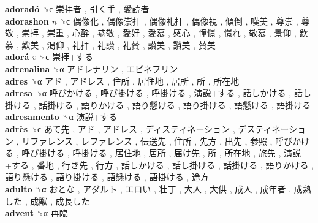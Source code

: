 \textbf{adoradó} ␝ϲ   崇拝者 ,  引く手 ,  愛読者   \\
\textbf{adorashon} \emph{n}  ␝ϲ   偶像化 ,  偶像崇拝 ,  偶像礼拝 ,  偶像視 ,  傾倒 ,  嘆美 ,  尊崇 ,  尊敬 ,  崇拝 ,  崇重 ,  心酔 ,  恭敬 ,  愛好 ,  愛慕 ,  感心 ,  憧憬 ,  憬れ ,  敬慕 ,  景仰 ,  欽慕 ,  歎美 ,  渇仰 ,  礼拝 ,  礼讃 ,  礼賛 ,  讃美 ,  讚美 ,  賛美   \\
\textbf{adorá} \emph{v}  ␝ϲ   崇拝+する   \\
\textbf{adrenalina} ␝α   アドレナリン ,  エピネフリン   \\
\textbf{adres} ␝α   アド ,  アドレス ,  住所 ,  居住地 ,  居所 ,  所 ,  所在地   \\
\textbf{adresa} ␝α   呼びかける ,  呼び掛ける ,  呼掛ける ,  演説+する ,  話しかける ,  話し掛ける ,  話掛ける ,  語りかける ,  語り懸ける ,  語り掛ける ,  語懸ける ,  語掛ける   \\
\textbf{adresamento} ␝α   演説+する   \\
\textbf{adrès} ␝ϲ   あて先 ,  アド ,  アドレス ,  ディスティネーション ,  デスティネーション ,  リファレンス ,  レファレンス ,  伝送先 ,  住所 ,  先方 ,  出先 ,  参照 ,  呼びかける ,  呼び掛ける ,  呼掛ける ,  居住地 ,  居所 ,  届け先 ,  所 ,  所在地 ,  旅先 ,  演説+する ,  番地 ,  行き先 ,  行方 ,  話しかける ,  話し掛ける ,  話掛ける ,  語りかける ,  語り懸ける ,  語り掛ける ,  語懸ける ,  語掛ける ,  途方   \\
\textbf{adulto} ␝α   おとな ,  アダルト ,  エロい ,  壮丁 ,  大人 ,  大供 ,  成人 ,  成年者 ,  成熟した ,  成獣 ,  成長した   \\
\textbf{advent} ␝α   再臨   \\
